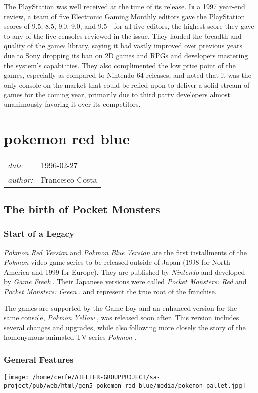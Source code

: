 \documentclass[a4paper,10pt]{book}
\newcommand{\pageHeader}[4]{
    \section{#1}
    \vspace{-0.3cm}
    \begin{table}[h!]
     \begin{tabular}{ll}
        \hline
        \textit{date} & #2 \\
        \textit{author: } & #3\\
        \hline
     \end{tabular}
    \end{table}
    \vspace{-0.3cm}
}
\begin{document}
          The PlayStation was well received at the time of its release. In a 1997 year-end review, a team of five Electronic Gaming Monthly editors gave the PlayStation scores of 9.5, 8.5, 9.0, 9.0, and 9.5 - for all five editors, the highest score they gave to any of the five consoles reviewed in the issue. They lauded the breadth and quality of the games library, saying it had vastly improved over previous years due to Sony dropping its ban on 2D games and RPGs and developers mastering the system's capabilities. They also complimented the low price point of the games, especially as compared to Nintendo 64 releases, and noted that it was the only console on the market that could be relied upon to deliver a solid stream of games for the coming year, primarily due to third party developers almost unanimously favoring it over its competitors.
         
 \newpage\pageHeader{pokemon red blue}{1996-02-27}{Francesco Costa}{The first installments of the world famous series of video games: Pokmon}
 \subsection{The birth of Pocket Monsters }
 
 \subsubsection{Start of a Legacy }
 
 \textit{Pokmon Red Version } and  \textit{Pokmon Blue Version } are the first installments
          of the  \textit{Pokmon } video game series to be released outside of Japan (1998 for
          North America and 1999 for Europe). They are published by  \textit{Nintendo } and developed by  \textit{Game Freak }.
          Their Japanese versions were called  \textit{Pocket Monsters: Red } and  \textit{Pocket Monsters: Green },
          and represent the true root of the franchise.
           
          The games are supported by the Game Boy and an enhanced version for the same console,
           \textit{Pokmon Yellow }, was released soon after. This version includes several changes and
          upgrades, while also following more closely the story of the homonymous
          animated TV series  \textit{Pokmon }.
         
 
 \subsubsection{General Features }
 \texttt{[image: /home/cerfe/ATELIER-GROUPPROJECT/sa-project/pub/web/html/gen5\_pokemon\_red\_blue/media/pokemon\_pallet.jpg]}
 
\end{document}
